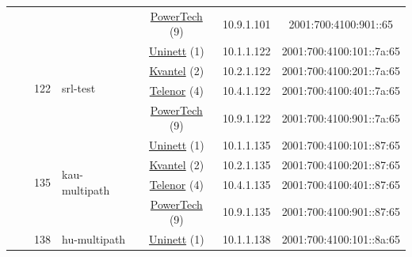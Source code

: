 \begin{small}
\begin{center}
\begin{longtable}{|c|c|c|c|c|c|c|c|}
  &  & \multicolumn{2}{|c|}{} & \multicolumn{2}{|c|}{\tiny{\href{http://www.powertech.no}{PowerTech} (9)}} & \tiny{10.9.1.101} & \tiny{2001:700:4100:901::65} \\* \cline{3-3}\cline{4-4}\cline{5-5}\cline{6-6}\cline{7-7}\cline{8-8}
  &  & \multirow{4}{*}{\tiny{122}} & \multicolumn{1}{|l|}{\multirow{4}{*}{\tiny{srl-test}}} & \multicolumn{2}{|c|}{\tiny{\href{https://www.uninett.no}{Uninett} (1)}} & \tiny{10.1.1.122} & \tiny{2001:700:4100:101::7a:65} \\* \cline{5-5}\cline{6-6}\cline{7-7}\cline{8-8}
  &  &  &  & \multicolumn{2}{|c|}{\tiny{\href{http://kvantel.no}{Kvantel} (2)}} & \tiny{10.2.1.122} & \tiny{2001:700:4100:201::7a:65} \\* \cline{5-5}\cline{6-6}\cline{7-7}\cline{8-8}
  &  &  &  & \multicolumn{2}{|c|}{\tiny{\href{https://www.telenor.no}{Telenor} (4)}} & \tiny{10.4.1.122} & \tiny{2001:700:4100:401::7a:65} \\* \cline{5-5}\cline{6-6}\cline{7-7}\cline{8-8}
  &  &  &  & \multicolumn{2}{|c|}{\tiny{\href{http://www.powertech.no}{PowerTech} (9)}} & \tiny{10.9.1.122} & \tiny{2001:700:4100:901::7a:65} \\* \cline{3-3}\cline{4-4}\cline{5-5}\cline{6-6}\cline{7-7}\cline{8-8}
  &  & \multirow{4}{*}{\tiny{135}} & \multicolumn{1}{|l|}{\multirow{4}{*}{\tiny{kau-multipath}}} & \multicolumn{2}{|c|}{\tiny{\href{https://www.uninett.no}{Uninett} (1)}} & \tiny{10.1.1.135} & \tiny{2001:700:4100:101::87:65} \\* \cline{5-5}\cline{6-6}\cline{7-7}\cline{8-8}
  &  &  &  & \multicolumn{2}{|c|}{\tiny{\href{http://kvantel.no}{Kvantel} (2)}} & \tiny{10.2.1.135} & \tiny{2001:700:4100:201::87:65} \\* \cline{5-5}\cline{6-6}\cline{7-7}\cline{8-8}
  &  &  &  & \multicolumn{2}{|c|}{\tiny{\href{https://www.telenor.no}{Telenor} (4)}} & \tiny{10.4.1.135} & \tiny{2001:700:4100:401::87:65} \\* \cline{5-5}\cline{6-6}\cline{7-7}\cline{8-8}
  &  &  &  & \multicolumn{2}{|c|}{\tiny{\href{http://www.powertech.no}{PowerTech} (9)}} & \tiny{10.9.1.135} & \tiny{2001:700:4100:901::87:65} \\* \cline{3-3}\cline{4-4}\cline{5-5}\cline{6-6}\cline{7-7}\cline{8-8}
  &  & \multirow{4}{*}{\tiny{138}} & \multicolumn{1}{|l|}{\multirow{4}{*}{\tiny{hu-multipath}}} & \multicolumn{2}{|c|}{\tiny{\href{https://www.uninett.no}{Uninett} (1)}} & \tiny{10.1.1.138} & \tiny{2001:700:4100:101::8a:65} \\* \cline{5-5}\cline{6-6}\cline{7-7}\cline{8-8}

\end{longtable}
\end{center}
\end{small}
